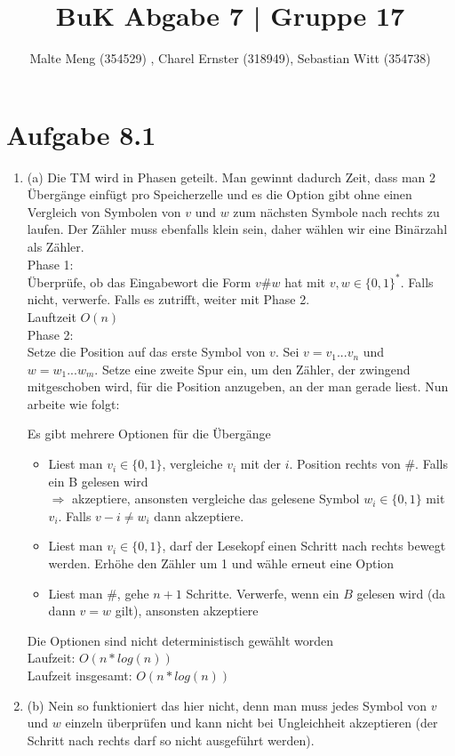 \documentclass{article}
\title{BuK Abgabe 7 | Gruppe 17}
\author{Malte Meng (354529) , Charel Ernster (318949), Sebastian Witt (354738)}
\begin{document}
	\maketitle 
	\section[a 8.1]{Aufgabe 8.1}
\begin{enumerate}
\item (a) Die TM wird in Phasen geteilt. Man gewinnt dadurch Zeit, dass man 2 Übergänge einfügt pro Speicherzelle und es die Option gibt ohne einen Vergleich von Symbolen von $v$ und $w$ zum nächsten Symbole nach rechts zu laufen. Der Zähler muss ebenfalls klein sein, daher wählen wir eine Binärzahl als Zähler.\\

Phase 1:\\

Überprüfe, ob das Eingabewort die Form $v \# w$ hat mit $v,w \in \{0,1\}^*$. Falls nicht, verwerfe. Falls es zutrifft, weiter mit Phase 2.\\
Lauftzeit $O(n)$\\

Phase 2:\\

Setze die Position auf das erste Symbol von $v$. Sei $v=v_1...v_n$ und $w=w_1...w_m$. Setze eine zweite Spur ein, um den Zähler, der zwingend mitgeschoben wird, für die Position anzugeben, an der man gerade liest. Nun arbeite wie folgt:

Es gibt mehrere Optionen für die Übergänge\\

\begin{itemize}
\item Liest man $v_i \in \{0,1\}$, vergleiche $v_i$ mit der $i$. Position rechts von $\#$. Falls ein B gelesen wird\\
$\Rightarrow$ akzeptiere, ansonsten vergleiche das gelesene Symbol $w_i \in \{0,1\}$ mit $v_i$. Falls $v-i \neq w_i$ dann akzeptiere. 

\item Liest man $v_i \in \{0,1\}$, darf der Lesekopf einen Schritt nach rechts bewegt werden. Erhöhe den Zähler um 1 und wähle erneut eine Option

\item Liest man $\#$, gehe $n+1$ Schritte. Verwerfe, wenn ein $B$ gelesen wird (da dann $v=w$ gilt), ansonsten akzeptiere 
\end{itemize}

Die Optionen sind nicht deterministisch gewählt worden\\
Laufzeit: $O(n*log(n))$\\
Laufzeit insgesamt: $O(n*log(n))$ 

\item (b) Nein so funktioniert das hier nicht, denn man muss jedes Symbol von $v$ und $w$ einzeln überprüfen und kann nicht bei Ungleichheit akzeptieren (der Schritt nach rechts darf so nicht ausgeführt werden).\\
\end{enumerate}
\end{document}
